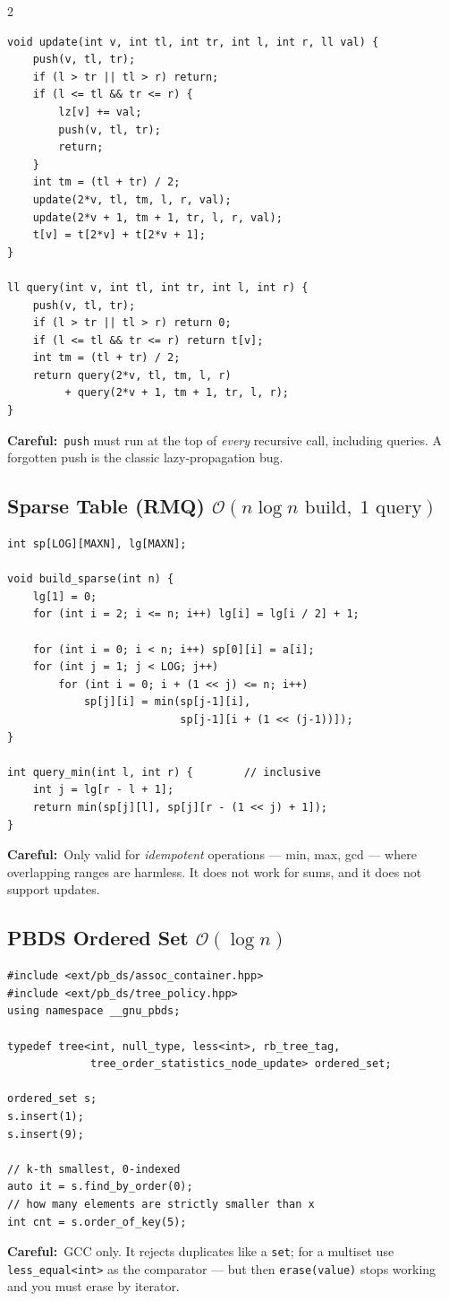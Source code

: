 \documentclass[10pt]{article}
\newcommand{\code}[1]{\texttt{\small #1}}
\newcommand{\sub}[2]{\subsection[#1]{#1\hspace{0.6em}%
  \textnormal{\color{accent2}\small$\mathcal{O}(#2)$}}}
\newcommand{\warn}[1]{{\color{warnc}\footnotesize\textbf{Careful:}}~{\footnotesize #1}\par}
\begin{document}
\begin{multicols}{2}
\begin{lstlisting}
void update(int v, int tl, int tr, int l, int r, ll val) {
    push(v, tl, tr);
    if (l > tr || tl > r) return;
    if (l <= tl && tr <= r) {
        lz[v] += val;
        push(v, tl, tr);
        return;
    }
    int tm = (tl + tr) / 2;
    update(2*v, tl, tm, l, r, val);
    update(2*v + 1, tm + 1, tr, l, r, val);
    t[v] = t[2*v] + t[2*v + 1];
}

ll query(int v, int tl, int tr, int l, int r) {
    push(v, tl, tr);
    if (l > tr || tl > r) return 0;
    if (l <= tl && tr <= r) return t[v];
    int tm = (tl + tr) / 2;
    return query(2*v, tl, tm, l, r)
         + query(2*v + 1, tm + 1, tr, l, r);
}
\end{lstlisting}
\warn{\code{push} must run at the top of \emph{every} recursive call,
including queries. A forgotten push is the classic lazy-propagation bug.}

\sub{Sparse Table (RMQ)}{n \log n \text{ build},\; 1 \text{ query}}
\begin{lstlisting}
int sp[LOG][MAXN], lg[MAXN];

void build_sparse(int n) {
    lg[1] = 0;
    for (int i = 2; i <= n; i++) lg[i] = lg[i / 2] + 1;

    for (int i = 0; i < n; i++) sp[0][i] = a[i];
    for (int j = 1; j < LOG; j++)
        for (int i = 0; i + (1 << j) <= n; i++)
            sp[j][i] = min(sp[j-1][i],
                           sp[j-1][i + (1 << (j-1))]);
}

int query_min(int l, int r) {        // inclusive
    int j = lg[r - l + 1];
    return min(sp[j][l], sp[j][r - (1 << j) + 1]);
}
\end{lstlisting}
\warn{Only valid for \emph{idempotent} operations --- min, max, gcd ---
where overlapping ranges are harmless. It does not work for sums, and it
does not support updates.}

\sub{PBDS Ordered Set}{\log n}
\begin{lstlisting}
#include <ext/pb_ds/assoc_container.hpp>
#include <ext/pb_ds/tree_policy.hpp>
using namespace __gnu_pbds;

typedef tree<int, null_type, less<int>, rb_tree_tag,
             tree_order_statistics_node_update> ordered_set;

ordered_set s;
s.insert(1);
s.insert(9);

// k-th smallest, 0-indexed
auto it = s.find_by_order(0);
// how many elements are strictly smaller than x
int cnt = s.order_of_key(5);
\end{lstlisting}
\warn{GCC only. It rejects duplicates like a \code{set}; for a multiset
use \code{less\_equal<int>} as the comparator --- but then
\code{erase(value)} stops working and you must erase by iterator.}

\end{multicols}
\end{document}
